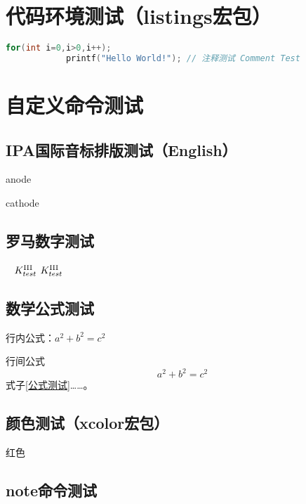 \section{代码环境测试（listings宏包）}
\sampletext

\begin{lstlisting}[language={C},title={\textsf{C语言代码段测试}}]
        for(int i=0,i>0,i++);
            printf("Hello World!"); // 注释测试 Comment Test
\end{lstlisting}

\sampletext

\section{自定义命令测试}
\subsection{IPA国际音标排版测试（English）}
anode 

cathode 

\subsection{罗马数字测试}
\  $K_{test}^{\text{\Romannum{3}}}$ $K_{test}^{\mathrm{\Romannum{3}}}$

\subsection{数学公式测试}
行内公式：$a^2 + b^2 = c^2$

行间公式
\begin{equation}
    a^2 + b^2 = c^2 \label{公式测试}
\end{equation}
式子\eqref{公式测试}……。

\subsection{颜色测试（xcolor宏包）}
 { 红色}


\subsection{note命令测试}



